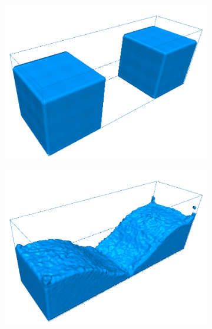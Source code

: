 \begin{figure}[h!]
    \captionsetup{justification=centering}
	\centering
	\begin{subfigure}[t]{.3\textwidth}
			\centering
        	\includegraphics[scale=0.65]{obrazky-figures/app/Blocks01.jpg}
        	\label{fig:GaussSeidl}
	\end{subfigure}%
	\begin{subfigure}[t]{.3\textwidth}
		\centering
		\includegraphics[scale=0.65]{obrazky-figures/app/Blocks02.jpg}
		\label{fig:GaussSeidlRB}
	\end{subfigure}
		\begin{subfigure}[t]{.3\textwidth}
			\centering

\end{subfigure}
\end{figure}
